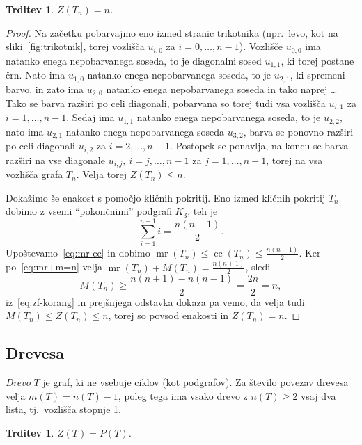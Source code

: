 \documentclass[12pt,a4paper,twoside]{article}
\theoremstyle{definition} %
\theoremstyle{plain} %
\newtheorem{trditev}[definicija]{Trditev}
\numberwithin{equation}{section}  %
\DeclareMathOperator{\mr}{mr}
\DeclareMathOperator{\cc}{cc}
\begin{document}
\begin{trditev}{{\cite[trditev 3.2]{aim2008minimumrank}}}
    $Z(T_n) = n$.
\end{trditev}
\begin{proof}
    Na začetku pobarvajmo eno izmed stranic trikotnika (npr.~levo, kot na sliki~\ref{fig:trikotnik}, torej vozlišča $u_{i,0}$ za $i = 0, \ldots, n-1$). Vozlišče $u_{0,0}$ ima natanko enega nepobarvanega soseda, to je diagonalni sosed $u_{1,1}$, ki torej postane črn. Nato ima $u_{1,0}$ natanko enega nepobarvanega soseda, to je $u_{2,1}$, ki spremeni barvo, in zato ima $u_{2,0}$ natanko enega nepobarvanega soseda in tako naprej \ldots Tako se barva razširi po celi diagonali, pobarvana so torej tudi vsa vozlišča $u_{i,1}$ za $i = 1, \ldots, n-1$. Sedaj ima $u_{1,1}$ natanko enega nepobarvanega soseda, to je $u_{2,2}$, nato ima $u_{2,1}$ natanko enega nepobarvanega soseda $u_{3,2}$, barva se ponovno razširi po celi diagonali $u_{i,2}$ za $i = 2, \ldots, n-1$. Postopek se ponavlja, na koncu se barva razširi na vse diagonale $u_{i,j},\ i = j, \ldots, n-1$ za $j = 1, \ldots, n-1$, torej na vsa vozlišča grafa $T_n$. Velja torej $Z(T_n) \leq n$.
    
    Dokažimo še enakost s pomočjo kličnih pokritij. Eno izmed kličnih pokritij $T_n$ dobimo z vsemi ``pokončnimi'' podgrafi $K_3$, teh je
    \[ \sum_{i=1}^{n-1} i = \frac{n(n-1)}{2}. \]
    Upoštevamo~\eqref{eq:mr-cc} in dobimo $\mr(T_n) \leq \cc(T_n) \leq \frac{n(n-1)}{2}$.
    Ker po~\eqref{eq:mr+m=n} velja $\mr(T_n) + M(T_n) = \frac{n(n+1)}{2}$, sledi
    \[ M(T_n) \geq \frac{n(n+1) - n(n-1)}{2} = \frac{2n}{2} = n, \]
    iz~\eqref{eq:zf-korang} in prejšnjega odstavka dokaza pa vemo, da velja tudi $M(T_n) \leq Z(T_n) \leq n$, torej so povsod enakosti in $Z(T_n) = n$.
\end{proof}

\subsection{Drevesa}
\emph{Drevo} $T$ je graf, ki ne vsebuje ciklov (kot podgrafov). Za število povezav drevesa velja $m(T) = n(T) - 1$, poleg tega ima vsako drevo z $n(T) \geq 2$ vsaj dva lista, tj.~vozlišča stopnje 1.

\begin{trditev}
    \label{trd:zf-dreves}
    $Z(T) = P(T)$.
\end{trditev}
\end{document}
